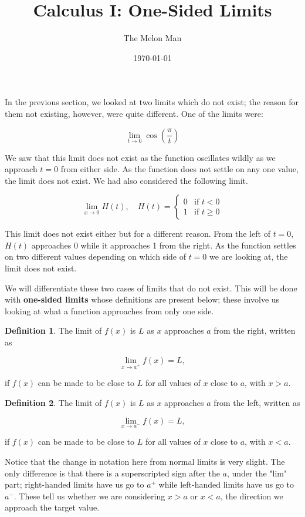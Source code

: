 \documentclass[12pt]{article}
\title{Calculus I: One-Sided Limits}
\author{The Melon Man}
\date{\today}
\theoremstyle{definition}
\newtheorem{definition}{Definition}
\begin{document}
\maketitle

In the previous section, we looked at two limits which do not exist; the reason for them not existing, however, were quite different.
One of the limits were:

\begin{equation*}
    \lim_{t\to0} \cos\left(\frac{\pi}{t}\right)
\end{equation*}

We saw that this limit does not exist as the function oscillates wildly as we approach $t=0$ from either side.
As the function does not settle on any one value, the limit does not exist.
We had also considered the following limit.

\begin{equation*}
    \lim_{x \to 0} H(t), \quad H(t) =
    \begin{cases}
        0 & \text{if } t < 0    \\
        1 & \text{if } t \geq 0
    \end{cases}
\end{equation*}

This limit does not exist either but for a different reason.
From the left of $t=0$, $H(t)$ approaches 0 while it approaches 1 from the right.
As the function settles on two different values depending on which side of $t=0$ we are looking at, the limit does not exist.

We will differentiate these two cases of limits that do not exist.
This will be done with \textbf{one-sided limits} whose definitions are present below; these involve us looking at what a function approaches from only one side.

\begin{definition}
    The limit of $f(x)$ is $L$ as $x$ approaches $a$ from the right, written as

    \begin{equation*}
        \lim_{x\to a^+} f(x) = L, \label{eq:1}
    \end{equation*}

    if $f(x)$ can be made to be close to $L$ for all values of $x$ close to $a$, with $x>a$.
\end{definition}

\begin{definition}
    The limit of $f(x)$ is $L$ as $x$ approaches $a$ from the left, written as

    \begin{equation*}
        \lim_{x\to a^-} f(x) = L, \label{eq:2}
    \end{equation*}

    if $f(x)$ can be made to be close to $L$ for all values of $x$ close to $a$, with $x<a$.
\end{definition}

Notice that the change in notation here from normal limits is very slight.
The only difference is that there is a superscripted sign after the $a$, under the "lim" part; right-handed limits have us go to $a^+$ while left-handed limits have us go to $a^-$.
These tell us whether we are considering $x>a$ or $x<a$, the direction we approach the target value.
\end{document}
